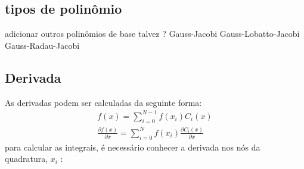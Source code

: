 \subsection{tipos de polinômio}
	adicionar outros polinômios de base talvez ?
	Gauss-Jacobi
	Gauss-Lobatto-Jacobi
	Gauss-Radau-Jacobi 


\subsection{Derivada}
	As derivadas podem ser calculadas da seguinte forma:
	\begin{align}
	f(x) = \sum^{N-1}_{i=0} f(x_i) C_i(x)\\
	\frac{\partial f(x)}{\partial x} = \sum^{N}_{i = 0} f(x_i) \frac{\partial C_i(x)}{\partial x}
	\end{align}
	para calcular as integrais, é necessário conhecer a derivada nos nós da quadratura, $x_i$ :

